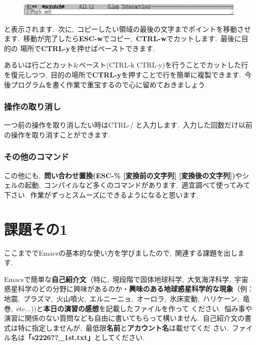 \documentclass{jarticle}
\begin{document}
\begin{figure}[ht]
  \begin{center}
     \includegraphics[width=130mm,pagebox=cropbox,clip]{fig/emacs003.pdf}
  \end{center}
\end{figure}

\noindent
と表示されます.\ 次に,\ コピーしたい領域の最後の文字までポイントを移動させ
ます.\ 移動が完了したら{\bf ESC-w}でコピー,\ {\bf CTRL-w}でカットします.\ 最後に目的の
場所で{\bf CTRL-y}を押せばペーストできます.\ 

あるいは行ごとカット\&ペースト(CTRL-k CTRL-y)を行うことでカットした行を復元しつつ,\ 目的の場所で{\bf CTRL-y}を押すことで行を簡単に複製できます.\ 今後プログラムを書く作業で重宝するので心に留めておきましょう.\ 

\subsubsection{操作の取り消し}
一つ前の操作を取り消したい時はCTRL-/ と入力します.\ 入力した回数だけ以前
の操作を取り消すことができます.\ 

\subsubsection{その他のコマンド}
この他にも,\ {\bf 問い合わせ置換(ESC-\% [変換前の文字列] [変換後の文字列])}やシェルの起動,\ 
コンパイルなど多くのコマンドがあります.\ 適宜調べて使ってみて下さい.\ 
作業がずっとスムーズにできるようになると思います.\ 


\section{課題その1}
ここまででEmacsの基本的な使い方を学びましたので,\ 関連する課題を出します.\ 

Emacsで簡単な{\bf 自己紹介文}（特に,\ 現段階で固体地球科学,\ 大気海洋科学,\ 宇宙
惑星科学のどの分野に興味があるのか・{\bf 興味のある地球惑星科学的な現象}（例：
  地震,\ プラズマ,\ 火山噴火,\ エルニーニョ,\ オーロラ,\ 氷床変動,\ ハリケーン,\ 竜巻,\ etc...))と{\bf 本日の演習の感想}を記載したファイルを作って
ください.\ 悩み事や演習に関係のない質問なども自由に書いてもらって構いません.\ 
自己紹介文の書式は特に指定しませんが,\ 最低限{\bf 名前}と{\bf アカウント名}は載せてくだ
さい.\ ファイル名は{\bf 「s2226??\_1st.txt」}としてください.\ 
\end{document}
